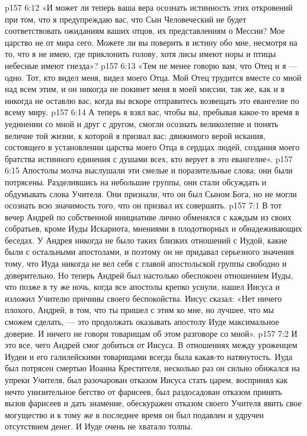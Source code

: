 \vs p157 6:12 \pc «И может ли теперь ваша вера осознать истинность этих откровений при том, что я предупреждаю вас, что Сын Человеческий не будет соответствовать ожиданиям ваших отцов, их представлениям о Мессии? Мое царство не от мира сего. Можете ли вы поверить в истину обо мне, несмотря на то, что я не имею, где приклонить голову, хотя лисы имеют норы и птицы небесные имеют гнезда»?
\vs p157 6:13 \pc «Тем не менее говорю вам, что Отец и я --- одно. Тот, кто видел меня, видел моего Отца. Мой Отец трудится вместе со мной над всем этим, и он никогда не покинет меня в моей миссии, так же, как и я никогда не оставлю вас, когда вы вскоре отправитесь возвещать это евангелие по всему миру.
\vs p157 6:14 А теперь я взял вас, чтобы вы, пребывая какое\hyp{}то время в уединении со мной и друг с другом, смогли осознать великолепие и понять величие той жизни, к которой я призвал вас: движимого верой искания, состоящего в установлении царства моего Отца в сердцах людей, создания моего братства истинного единения с душами всех, кто верует в это евангелие».
\vs p157 6:15 \pc Апостолы молча выслушали эти смелые и поразительные слова; они были потрясены. Разделившись на небольшие группы, они стали обсуждать и обдумывать слова Учителя. Они признали, что он был Сыном Бога, но не могли осознать всю значимость того, что он призвал их совершить.
\vs p157 7:1 В тот вечер Андрей по собственной инициативе лично обменялся с каждым из своих собратьев, кроме Иуды Искариота, мнениями в плодотворных и обнадеживающих беседах. У Андрея никогда не было таких близких отношений с Иудой, какие были с остальными апостолами, и поэтому он не придавал серьезного значения тому, что Иуда никогда не вел себя с главой апостольской группы свободно и доверительно. Но теперь Андрей был настолько обеспокоен отношением Иуды, что позже в ту же ночь, когда все апостолы крепко уснули, нашел Иисуса и изложил Учителю причины своего беспокойства. Иисус сказал: «Нет ничего плохого, Андрей, в том, что ты пришел с этим ко мне, но лучшее, что мы сможем сделать, --- это продолжать оказывать апостолу Иуде максимальное доверие. И ничего не говори товарищам об этом разговоре со мной».
\vs p157 7:2 И это все, чего Андрей смог добиться от Иисуса. В отношениях между уроженцем Иудеи и его галилейскими товарищами всегда была какая\hyp{}то натянутость. Иуда был потрясен смертью Иоанна Крестителя, несколько раз он сильно обижался на упреки Учителя, был разочарован отказом Иисуса стать царем, воспринял как нечто унизительное бегство от фарисеев, был раздосадован отказом принять вызов фарисеев и дать знамение, обескуражен отказом своего Учителя явить свое могущество и к тому же в последнее время он был подавлен и удручен отсутствием денег. И Иуде очень не хватало толпы.
